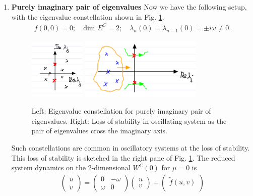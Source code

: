 \begin{enumerate}
\item \textbf{Purely imaginary pair of eigenvalues} 
	Now we have the following setup, with the eigenvalue constellation shown in Fig. \ref{fig:imag_pair_eigv}. 
	\begin{align}
		f(0,0)=0;\quad  \textrm{dim } E^{C}=2; \quad \lambda_n(0)= \overline{\lambda }_{n-1}(0) = \pm i\omega \neq 0.
	\end{align}
\begin{figure}[h!]
	\centering
	\includegraphics[width=0.25\textwidth]{figures/ch3/17imag_pair_eigv.png}
	\includegraphics[width=0.55\textwidth]{figures/ch3/18loss_of_stab_pair_imag.png}
	\caption{Left: Eigenvalue constellation for purely imaginary pair of eigenvalues. Right: Loss of stability in oscillating system as the pair of eigenvalues cross the imaginary axis.}
	\label{fig:imag_pair_eigv}
\end{figure}
Such constellations are common in oscillatory systems at the loss of stability. This loss of stability is sketched in the right pane of Fig. \ref{fig:imag_pair_eigv}. The reduced system dynamics on the 2-dimensional $W^{C}(0)$ for $\mu =0$ is
\begin{align}
	\begin{pmatrix}
		\dot{u} \\ \dot{v}
	\end{pmatrix}
	= 
	\begin{pmatrix}
		0 & -\omega \\
		\omega & 0
	\end{pmatrix}
	\begin{pmatrix}
		u \\ v
	\end{pmatrix}
	 +
	 \begin{pmatrix}
		 \tilde{f}(u,v) \\

\end{pmatrix}
\end{align}
\end{enumerate}
